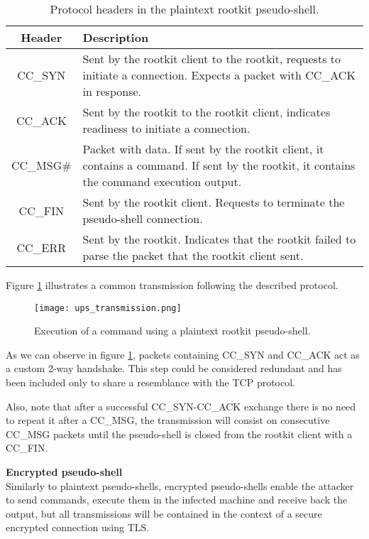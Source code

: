 \begin{table}[htbp]
\begin{tabular}{|c|>{\centering\arraybackslash}p{8cm}|}
\hline
\textbf{Header} & \textbf{Description}\\
\hline
\hline
CC\_SYN & Sent by the rootkit client to the rootkit, requests to initiate a connection. Expects a packet with CC\_ACK in response.\\
\hline
CC\_ACK & Sent by the rootkit to the rootkit client, indicates readiness to initiate a connection.\\
\hline
CC\_MSG\# & Packet with data. If sent by the rootkit client, it contains a command. If sent by the rootkit, it contains the command execution output.\\
\hline
CC\_FIN & Sent by the rootkit client. Requests to terminate the pseudo-shell connection.\\
\hline
CC\_ERR & Sent by the rootkit. Indicates that the rootkit failed to parse the packet that the rootkit client sent.\\
\hline
\end{tabular}
\caption{Protocol headers in the plaintext rootkit pseudo-shell.}
\label{table:ups_headers}
\end{table}

Figure \ref{fig:ups_transmission} illustrates a common transmission following the described protocol.

\begin{figure}[htbp]
	\centering
	\texttt{[image: ups\_transmission.png]}
	\caption{Execution of a command using a plaintext rootkit pseudo-shell.}
	\label{fig:ups_transmission}
\end{figure}

As we can observe in figure \ref{fig:ups_transmission}, packets containing CC\_SYN and CC\_ACK act as a custom 2-way handshake. This step could be considered redundant and has been included only to share a resemblance with the TCP protocol.

Also, note that after a successful CC\_SYN-CC\_ACK exchange there is no need to repeat it after a CC\_MSG, the transmission will consist on consecutive CC\_MSG packets until the pseudo-shell is closed from the rootkit client with a CC\_FIN.


\textbf{Encrypted pseudo-shell}\\
Similarly to plaintext pseudo-shells, encrypted pseudo-shells enable the attacker to send commands, execute them in the infected machine and receive back the output, but all transmissions will be contained in the context of a secure encrypted connection using TLS.

